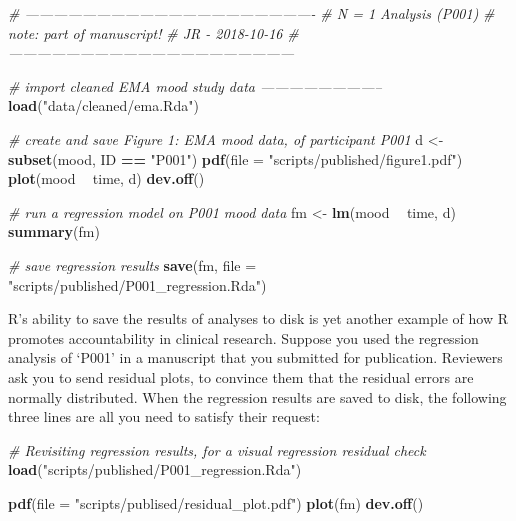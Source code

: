 \documentclass[]{book}
\newenvironment{Shaded}{\begin{snugshade}}{\end{snugshade}}
\newcommand{\KeywordTok}[1]{\textcolor[rgb]{0.13,0.29,0.53}{\textbf{#1}}}
\newcommand{\DataTypeTok}[1]{\textcolor[rgb]{0.13,0.29,0.53}{#1}}
\newcommand{\StringTok}[1]{\textcolor[rgb]{0.31,0.60,0.02}{#1}}
\newcommand{\CommentTok}[1]{\textcolor[rgb]{0.56,0.35,0.01}{\textit{#1}}}
\newcommand{\OperatorTok}[1]{\textcolor[rgb]{0.81,0.36,0.00}{\textbf{#1}}}
\newcommand{\NormalTok}[1]{#1}
\begin{document}
\begin{Shaded}
\begin{Highlighting}[]
\CommentTok{# -------------------------------------------------------------}
\CommentTok{# N = 1 Analysis (P001)}
\CommentTok{# note: part of manuscript!}
\CommentTok{# JR - 2018-10-16}
\CommentTok{# ------------------------------------------------------------}

\CommentTok{# import cleaned EMA mood study data --------------------------}
\KeywordTok{load}\NormalTok{(}\StringTok{"data/cleaned/ema.Rda"}\NormalTok{)}

\CommentTok{# create and save Figure 1: EMA mood data, of participant P001 }
\NormalTok{d <-}\StringTok{ }\KeywordTok{subset}\NormalTok{(mood, ID }\OperatorTok{==}\StringTok{ "P001"}\NormalTok{)}
\KeywordTok{pdf}\NormalTok{(}\DataTypeTok{file =} \StringTok{"scripts/published/figure1.pdf"}\NormalTok{)}
\KeywordTok{plot}\NormalTok{(mood }\OperatorTok{~}\StringTok{ }\NormalTok{time, d)}
\KeywordTok{dev.off}\NormalTok{()}

\CommentTok{# run a regression model on P001 mood data}
\NormalTok{fm <-}\StringTok{ }\KeywordTok{lm}\NormalTok{(mood }\OperatorTok{~}\StringTok{ }\NormalTok{time, d)}
\KeywordTok{summary}\NormalTok{(fm)}

\CommentTok{# save regression results }
\KeywordTok{save}\NormalTok{(fm, }\DataTypeTok{file =} \StringTok{"scripts/published/P001_regression.Rda"}\NormalTok{)}
\end{Highlighting}
\end{Shaded}

R's ability to save the results of analyses to disk is yet another
example of how R promotes accountability in clinical research. Suppose
you used the regression analysis of `P001' in a manuscript that you
submitted for publication. Reviewers ask you to send residual plots, to
convince them that the residual errors are normally distributed. When
the regression results are saved to disk, the following three lines are
all you need to satisfy their request:

\begin{Shaded}
\begin{Highlighting}[]
\CommentTok{# Revisiting regression results, for a visual regression residual check  }
\KeywordTok{load}\NormalTok{(}\StringTok{"scripts/published/P001_regression.Rda"}\NormalTok{)}

\KeywordTok{pdf}\NormalTok{(}\DataTypeTok{file =} \StringTok{"scripts/publised/residual_plot.pdf"}\NormalTok{)}
\KeywordTok{plot}\NormalTok{(fm)}
\KeywordTok{dev.off}\NormalTok{()}
\end{Highlighting}
\end{Shaded}
\end{document}
